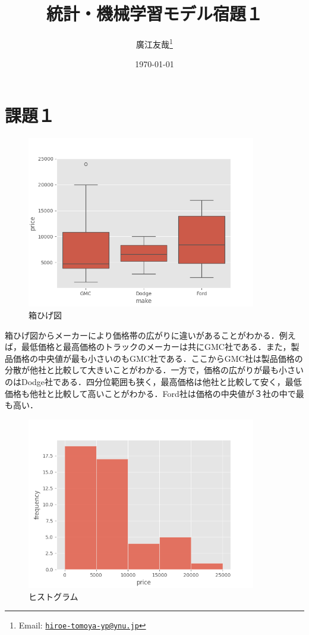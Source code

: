 \documentclass[article]{jlreq}
\title{統計・機械学習モデル宿題１}
\author{廣江友哉\;2125178\thanks{Email: \texttt{\href{hiroe-tomoya-yp@ynu.jp}{hiroe-tomoya-yp@ynu.jp}}}}
\date{\today}
\begin{document}
\maketitle

\tableofcontents


\section{課題１}

\begin{figure}[H]
  \centering
  \includegraphics[width=100mm]{../plots/hw1/boxplot.png}
  \caption{箱ひげ図}
\end{figure}

箱ひげ図からメーカーにより価格帯の広がりに違いがあることがわかる．例えば，最低価格と最高価格のトラックのメーカーは共にGMC社である．また，製品価格の中央値が最も小さいのもGMC社である．ここからGMC社は製品価格の分散が他社と比較して大きいことがわかる．一方で，価格の広がりが最も小さいのはDodge社である．四分位範囲も狭く，最高価格は他社と比較して安く，最低価格も他社と比較して高いことがわかる．Ford社は価格の中央値が３社の中で最も高い．

\begin{figure}[H]
  \centering
  \includegraphics[width=100mm]{../plots/hw1/histogram.png}
  \caption{ヒストグラム}
\end{figure}
\end{document}
